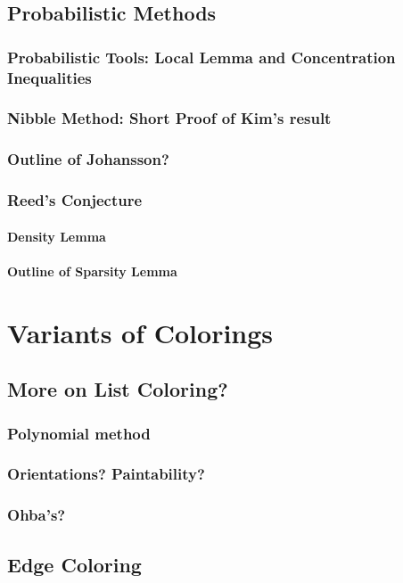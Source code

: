\documentclass[12pt,twoside,openright,a4paper]{book}
\begin{document}
\chapter{Probabilistic Methods}
\section{Probabilistic Tools: Local Lemma and Concentration Inequalities}
\section{Nibble Method: Short Proof of Kim's result}
\section{Outline of Johansson?}
\section{Reed's Conjecture}
\subsection{Density Lemma}
\subsection{Outline of Sparsity Lemma}

\part{Variants of Colorings}

\chapter{More on List Coloring?}

\section{Polynomial method}

\section{Orientations? Paintability?}
\section{Ohba's?}

\chapter{Edge Coloring}\label{chap:edgecol}
\end{document}
